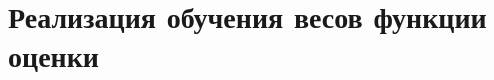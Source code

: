 \documentclass[a4paper,12pt]{diplom}
\begin{document}


\chapter{Реализация обучения весов функции оценки}


\end{document}
